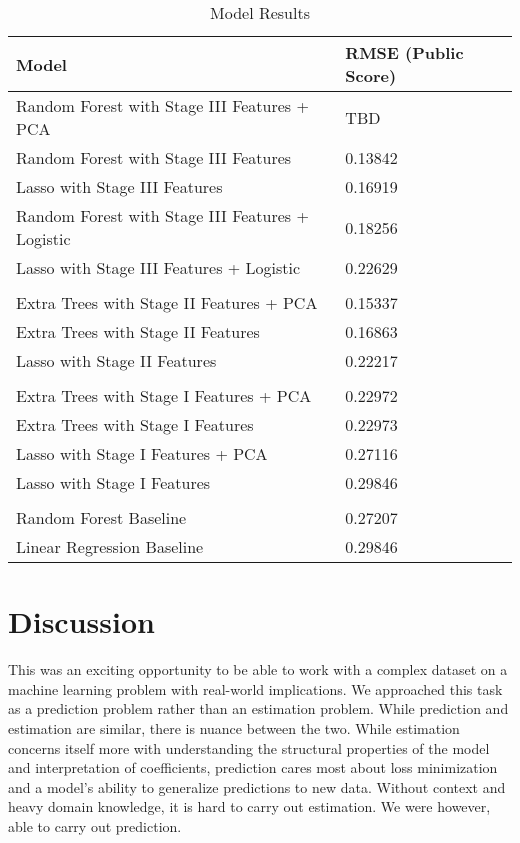 \documentclass[11pt, oneside]{article}   	%
\begin{document}
\begin{table}[]
\centering

\label{my-label}
\begin{tabular}{@{}ll@{}}
\toprule
\textbf{Model} & \textbf{RMSE (Public Score)} \\ \midrule
Random Forest with Stage III Features  + PCA & TBD\\
Random Forest with Stage III Features & 0.13842\\
Lasso with Stage III Features &  0.16919\\
Random Forest with Stage III Features + Logistic &  0.18256 \\
Lasso with Stage III Features + Logistic & 0.22629 \\


\\
Extra Trees with Stage II Features + PCA & 0.15337\\
Extra Trees with Stage II Features & 0.16863     \\
Lasso with Stage II Features & 0.22217\\
\\

Extra Trees with Stage I Features + PCA &  0.22972 \\
Extra Trees with Stage I Features & 0.22973\\
Lasso with Stage I Features + PCA & 0.27116\\
Lasso with Stage I Features &  0.29846\\


\\
Random Forest Baseline &  0.27207\\
Linear Regression Baseline & 0.29846  \\

\bottomrule
\end{tabular}
\caption{Model Results}
\end{table}

\section{Discussion}
This was an exciting opportunity to be able to work with a complex dataset on a machine learning problem with real-world implications. We approached this task as a prediction problem rather than an estimation problem. While prediction and estimation are similar, there is nuance between the two. While estimation concerns itself more with understanding the structural properties of the model and interpretation of coefficients, prediction cares most about loss minimization and a model's ability to generalize predictions to new data. Without context and heavy domain knowledge, it is hard to carry out estimation. We were however, able to carry out prediction. 
\end{document}
